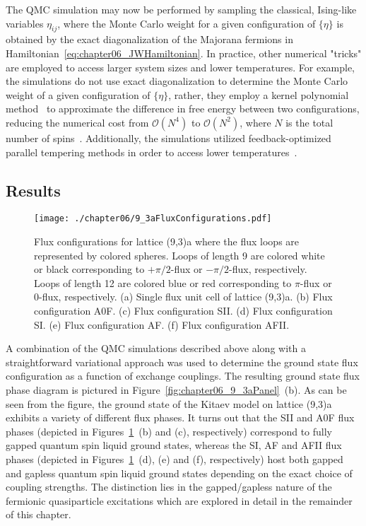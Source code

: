 The QMC simulation may now be performed by sampling the classical, Ising-like variables $\eta_{ij}$, where the Monte Carlo weight for a given configuration of $\{\eta\}$ is obtained by the exact diagonalization of the Majorana fermions in Hamiltonian~\eqref{eq:chapter06_JWHamiltonian}.
In practice, other numerical "tricks" are employed to access larger system sizes and lower temperatures.
For example, the simulations do not use exact diagonalization to determine the Monte Carlo weight of a given configuration of $\{\eta\}$, rather, they employ a kernel polynomial method~\cite{WeisseRMP2006,WeissePRL2009} to approximate the difference in free energy between two configurations, reducing the numerical cost from $\mathcal{O}(N^4)$ to $\mathcal{O}(N^2)$, where $N$ is the total number of spins~\cite{MischenkoPRB2017}.
Additionally, the simulations utilized feedback-optimized parallel tempering methods in order to access lower temperatures~\cite{TrebstPRE2004,KatzgraberJSM2006}.


%
%
\subsection{Results}
\label{section:chapter06_QMCResults}
%
%
%
\begin{figure}[tb]
	\centering
	\texttt{[image: ./chapter06/9\_3aFluxConfigurations.pdf]}
	\caption{
		Flux configurations for lattice (9,3)a where the flux loops are represented by colored spheres.
		Loops of length 9 are colored white or black corresponding to $+\pi/2$-flux or $-\pi/2$-flux, respectively.
		Loops of length 12 are colored blue or red corresponding to $\pi$-flux or $0$-flux, respectively.
		(a) Single flux unit cell of lattice (9,3)a.
		(b) Flux configuration A0F.
		(c) Flux configuration SII.
		(d) Flux configuration SI.
		(e) Flux configuration AF.
		(f) Flux configuration AFII.
	}
	\label{fig:chapter06_9_3aFluxConfigurations}
\end{figure}
%
A combination of the QMC simulations described above along with a straightforward variational approach was used to determine the ground state flux configuration as a function of exchange couplings.
The resulting ground state flux phase diagram is pictured in Figure~\ref{fig:chapter06_9_3aPanel}~(b).
As can be seen from the figure, the ground state of the Kitaev model on lattice (9,3)a exhibits a variety of different flux phases.
It turns out that the SII and A0F flux phases (depicted in Figures~\ref{fig:chapter06_9_3aFluxConfigurations}~(b) and (c), respectively) correspond to fully gapped quantum spin liquid ground states, whereas the SI, AF and AFII flux phases (depicted in Figures~\ref{fig:chapter06_9_3aFluxConfigurations}~(d), (e) and (f), respectively) host both gapped and gapless quantum spin liquid ground states depending on the exact choice of coupling strengths.
The distinction lies in the gapped/gapless nature of the fermionic quasiparticle excitations which are explored in detail in the remainder of this chapter.


